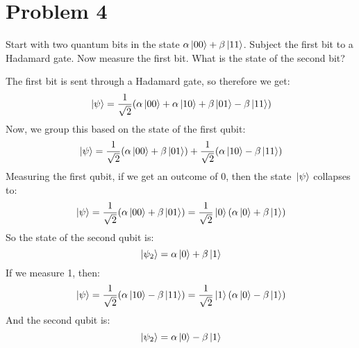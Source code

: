 \documentclass[10pt]{article}
\begin{document}
	\section*{Problem 4}
	Start with two quantum bits in the state \( \alpha\ket*{00} + \beta\ket*{11} \). Subject the first bit to 
	a Hadamard gate. Now measure the first bit. What is the state of the second bit?

	\begin{solution}
		The first bit is sent through a Hadamard gate, so therefore we get:
		\[
		\ket*{\psi} = \frac{1}{\sqrt{2} }(\alpha \ket*{00} + \alpha \ket*{10} + \beta\ket*{01} - \beta \ket*{11})
		\] 
		Now, we group this based on the state of the first qubit:
		\[
		\ket*{\psi} = \frac{1}{\sqrt{2} }(\alpha\ket*{00} + \beta\ket*{01}) 
		+ \frac{1}{\sqrt{2} }(\alpha \ket*{10} - \beta\ket*{11})
		\] 
		Measuring the first qubit, if we get an outcome of 0, then the state \( \ket*{\psi} \) collapses
		to:
		\[
		\ket*{\psi} = \frac{1}{\sqrt{2} }(\alpha \ket*{00} + \beta\ket*{01}) = \frac{1}{\sqrt{2} }
		\ket*{0}(\alpha \ket*{0} + \beta\ket*{1})
		\] 
		So the state of the second qubit is:
		\[
		\ket*{\psi_2} = \alpha \ket*{0} + \beta\ket*{1}
		\] 
		If we measure 1, then: 
		\[
		\ket*{\psi} = \frac{1}{\sqrt{2} }(\alpha \ket*{10} - \beta \ket*{11}) = \frac{1}{\sqrt{2} }\ket*{1}
		(\alpha\ket*{0} - \beta\ket*{1})
		\] 
		And the second qubit is: 
		\[
		\ket*{\psi_2} = \alpha \ket*{0} - \beta\ket*{1}
		\] 
	\end{solution}
\end{document}

